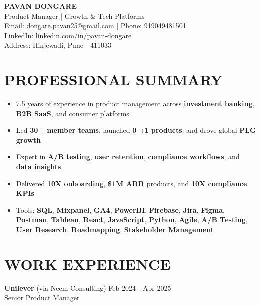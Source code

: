 \documentclass[10pt,a4paper]{article}
\newcommand{\experienceitem}[4]{
    #1 \hfill #2 \\
    #3 \hfill \textit{#4}
}
\begin{document}
\vspace*{1\baselineskip} %

\begin{center}
    \textbf{\Large PAVAN DONGARE} \\
    Product Manager | Growth \& Tech Platforms \\
    Email: dongare.pavan25@gmail.com | Phone: 919049481501 \\
    LinkedIn: \href{https://linkedin.com/in/pavan-dongare}{\textcolor{blue!70!black}{linkedin.com/in/pavan-dongare}} \\
    Address: Hinjewadi, Pune - 411033
\end{center}

\section{PROFESSIONAL SUMMARY}
\begin{itemize}[leftmargin=*,itemsep=1pt,topsep=1pt]
    \item 7.5 years of experience in product management across \textbf{investment banking}, \textbf{B2B SaaS}, and consumer platforms
    \item Led \textbf{30+ member teams}, launched \textbf{0→1 products}, and drove global \textbf{PLG growth}
    \item Expert in \textbf{A/B testing}, \textbf{user retention}, \textbf{compliance workflows}, and \textbf{data insights}
    \item Delivered \textbf{10X onboarding}, \textbf{\$1M ARR} products, and \textbf{10X compliance KPIs}
    \item Tools: \textbf{SQL}, \textbf{Mixpanel}, \textbf{GA4}, \textbf{PowerBI}, \textbf{Firebase}, \textbf{Jira}, \textbf{Figma}, \textbf{Postman}, \textbf{Tableau}, \textbf{React}, \textbf{JavaScript}, \textbf{Python}, \textbf{Agile}, \textbf{A/B Testing}, \textbf{User Research}, \textbf{Roadmapping}, \textbf{Stakeholder Management}
\end{itemize}

\section{WORK EXPERIENCE}

\experienceitem{\textbf{Unilever} (via Neem Consulting)}{Feb 2024 - Apr 2025}{Senior Product Manager}{}
\end{document}
